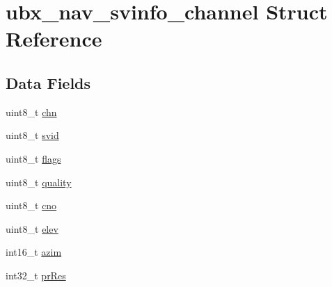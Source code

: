 \hypertarget{structubx__nav__svinfo__channel}{\section{ubx\+\_\+nav\+\_\+svinfo\+\_\+channel Struct Reference}
\label{structubx__nav__svinfo__channel}
}
\subsection*{Data Fields}
\begin{DoxyCompactItemize}
\item 
uint8\+\_\+t \hyperlink{structubx__nav__svinfo__channel_aae5089d71d4e5be55e64d4c46e268354}{chn}
\item 
uint8\+\_\+t \hyperlink{structubx__nav__svinfo__channel_abae357cc8ba275f75880508f379c0255}{svid}
\item 
uint8\+\_\+t \hyperlink{structubx__nav__svinfo__channel_a49a1e290e8d6c08b07b10e4ce95a8e02}{flags}
\item 
uint8\+\_\+t \hyperlink{structubx__nav__svinfo__channel_a09bf7b4e9746f119072e0f0beb9358bf}{quality}
\item 
uint8\+\_\+t \hyperlink{structubx__nav__svinfo__channel_aa2f610aae3257eddca65378e78d0d659}{cno}
\item 
uint8\+\_\+t \hyperlink{structubx__nav__svinfo__channel_a48b8bc2fa68faed09b7de9cc23b2acbe}{elev}
\item 
int16\+\_\+t \hyperlink{structubx__nav__svinfo__channel_a480dfbbe79395a40f63e4c364618ea3c}{azim}
\item 
int32\+\_\+t \hyperlink{structubx__nav__svinfo__channel_a6dcab6073e9601fe14b0d27a7bb41b87}{pr\+Res}
\end{DoxyCompactItemize}


